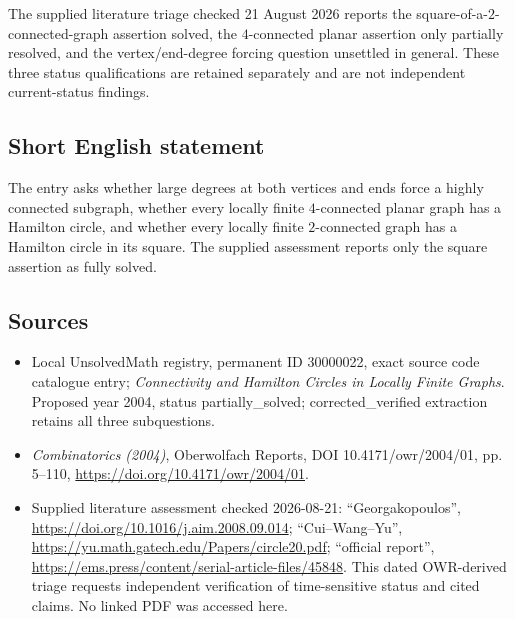 \documentclass[11pt]{article}
\begin{document}
The supplied literature triage checked 21 August 2026 reports the square-of-a-$2$-connected-graph assertion solved, the $4$-connected planar assertion only partially resolved, and the vertex/end-degree forcing question unsettled in general. These three status qualifications are retained separately and are not independent current-status findings.
\subsection{Short English statement}
The entry asks whether large degrees at both vertices and ends force a highly connected subgraph, whether every locally finite $4$-connected planar graph has a Hamilton circle, and whether every locally finite $2$-connected graph has a Hamilton circle in its square. The supplied assessment reports only the square assertion as fully solved.
\subsection{Sources}
\begin{itemize}
\item Local UnsolvedMath registry, permanent ID 30000022, exact source code catalogue entry; \emph{Connectivity and Hamilton Circles in Locally Finite Graphs}. Proposed year 2004, status partially\_solved; corrected\_verified extraction retains all three subquestions.
\item \emph{Combinatorics (2004)}, Oberwolfach Reports, DOI 10.4171/owr/2004/01, pp. 5--110, \url{https://doi.org/10.4171/owr/2004/01}.
\item Supplied literature assessment checked 2026-08-21: ``Georgakopoulos'', \url{https://doi.org/10.1016/j.aim.2008.09.014}; ``Cui--Wang--Yu'', \url{https://yu.math.gatech.edu/Papers/circle20.pdf}; ``official report'', \url{https://ems.press/content/serial-article-files/45848}. This dated OWR-derived triage requests independent verification of time-sensitive status and cited claims. No linked PDF was accessed here.
\end{itemize}
\end{document}

